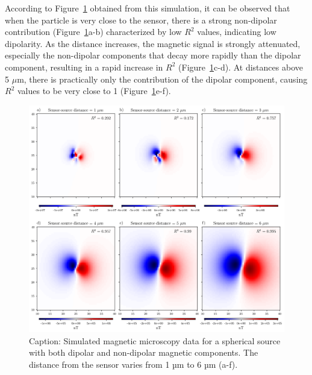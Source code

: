 According to Figure~\ref{non-dipolarity-synthetic-data} obtained from this simulation, it can be observed that when the particle is very close to the sensor, there is a strong non-dipolar contribution (Figure~\ref{non-dipolarity-synthetic-data}a-b) characterized by low $R^2$ values, indicating low dipolarity. As the distance increases, the magnetic signal is strongly attenuated, especially the non-dipolar components that decay more rapidly than the dipolar component, resulting in a rapid increase in $R^2$ (Figure~\ref{non-dipolarity-synthetic-data}c-d). At distances above 5 $\mu$m, there is practically only the contribution of the dipolar component, causing $R^2$ values to be very close to 1 (Figure~\ref{non-dipolarity-synthetic-data}e-f).

\begin{figure}[tb!]
  \centering
  \includegraphics[width=1\linewidth]{paper/figures/non-dipolarity-synthetic.png}
  \caption{Caption: Simulated magnetic microscopy data for a spherical source with both dipolar and non-dipolar magnetic components. The distance from the sensor varies from 1 µm to 6 µm (a-f).}
  \label{non-dipolarity-synthetic-data}
\end{figure}


